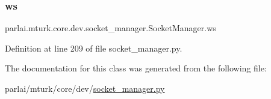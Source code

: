\subsubsection{\texorpdfstring{ws}{ws}}
{\footnotesize\ttfamily parlai.\+mturk.\+core.\+dev.\+socket\+\_\+manager.\+Socket\+Manager.\+ws}



Definition at line 209 of file socket\+\_\+manager.\+py.



The documentation for this class was generated from the following file\+:\begin{DoxyCompactItemize}
\item 
parlai/mturk/core/dev/\hyperlink{dev_2socket__manager_8py}{socket\+\_\+manager.\+py}\end{DoxyCompactItemize}
